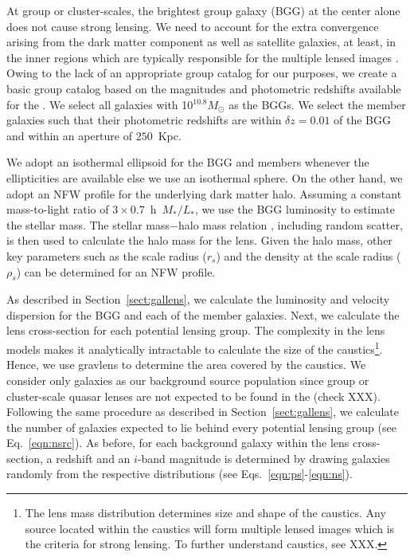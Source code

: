 \documentclass[useAMS,usenatbib,a4paper]{mn2e}
\begin{document}
At group or cluster-scales, the brightest group galaxy (BGG) at the center alone
does not cause strong lensing. We need to account for the extra convergence
arising from the dark matter component as well as satellite galaxies, at least,
in the inner regions which are typically responsible for the multiple lensed
images \citep{Oguri2005,Oguri2006}. Owing to the lack of an appropriate group
catalog for our purposes, we create a basic group catalog based on the
magnitudes and photometric redshifts available for the \cfhtls. We select all
galaxies with 10$^{10.8} M_\odot$ as the BGGs. We select the member galaxies
such that their photometric redshifts are within $\delta z = 0.01$ of the BGG
and within an aperture of $250$~Kpc. 

We adopt an isothermal ellipsoid for the BGG and members whenever the
ellipticities are available else we use an isothermal sphere. On the other hand, we
adopt an NFW profile for the underlying dark matter halo. Assuming a constant
mass-to-light ratio of $3 \times 0.7$~h~$M_{*}/L_{*}$, we use the BGG luminosity
to estimate the stellar mass. The stellar mass$-$halo mass relation
\citep{behroozi13}, including random scatter, is then used to calculate the halo
mass for the lens. Given the halo mass, other key parameters such as the scale
radius ($r_s$) and the density at the scale radius ($\rho_s$) can be determined for an
NFW profile. 

As described in Section~\ref{sect:gallens}, we calculate the luminosity and
velocity dispersion for the BGG and each of the member galaxies. Next, we
calculate the lens cross-section for each potential lensing group. The
complexity in the lens models makes it analytically intractable to calculate the
size of the caustics\footnote{The lens mass distribution determines size and
shape of the caustics. Any source located within the caustics will form multiple
lensed images which is the criteria for strong lensing. To further
understand caustics, see XXX.}.  Hence, we use {\sc
gravlens} to determine the area covered by the caustics. We consider only
galaxies as our background source population since group or cluster-scale quasar
lenses are not expected to be found in the \cfhtls (check XXX).  Following the same
procedure as described in Section~\ref{sect:gallens}, we calculate the number of
galaxies expected to lie behind every potential lensing group (see
Eq.~\ref{eqn:nsrc}). As before, for each background galaxy within the lens cross-section, a
redshift and an $i$-band magnitude is determined by drawing galaxies randomly
from the respective distributions (see Eqs.~\ref{eqn:ps}-\ref{eqn:ns}). 
\end{document}

